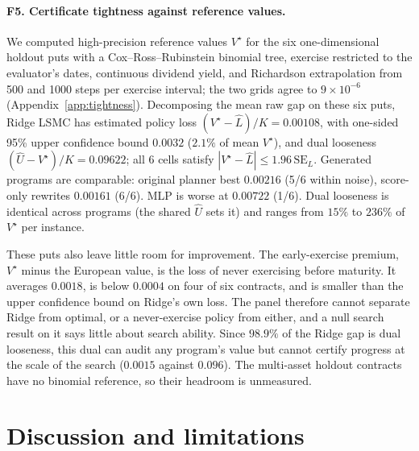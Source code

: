 \documentclass{article}
\begin{document}
\paragraph{F5. Certificate tightness against reference values.}
We computed high-precision reference values $V^\star$ for the six one-dimensional holdout puts with a Cox--Ross--Rubinstein binomial tree, exercise restricted to the evaluator's dates, continuous dividend yield, and Richardson extrapolation from 500 and 1000 steps per exercise interval; the two grids agree to $9\times10^{-6}$ (Appendix~\ref{app:tightness}). Decomposing the mean raw gap on these six puts, Ridge LSMC has estimated policy loss $(V^\star{-}\hat L)/K = 0.00108$, with one-sided 95\% upper confidence bound $0.0032$ ($2.1\%$ of mean $V^\star$), and dual looseness $(\hat U{-}V^\star)/K = 0.09622$; all 6 cells satisfy $|V^\star{-}\hat L| \le 1.96\,\mathrm{SE}_L$. Generated programs are comparable: original planner best $0.00216$ (5/6 within noise), score-only rewrites $0.00161$ (6/6). MLP is worse at $0.00722$ (1/6). Dual looseness is identical across programs (the shared $\hat U$ sets it) and ranges from $15\%$ to $236\%$ of $V^\star$ per instance.

These puts also leave little room for improvement. The early-exercise premium, $V^\star$ minus the European value, is the loss of never exercising before maturity. It averages $0.0018$, is below $0.0004$ on four of six contracts, and is smaller than the upper confidence bound on Ridge's own loss. The panel therefore cannot separate Ridge from optimal, or a never-exercise policy from either, and a null search result on it says little about search ability. Since $98.9\%$ of the Ridge gap is dual looseness, this dual can audit any program's value but cannot certify progress at the scale of the search ($0.0015$ against $0.096$). The multi-asset holdout contracts have no binomial reference, so their headroom is unmeasured.

\section{Discussion and limitations}
\label{sec:discussion}
\end{document}
